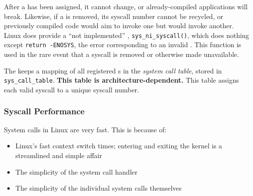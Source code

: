 After a  has been assigned, it cannot change, or already-compiled applications will break.
Likewise, if a  is removed, its syscall number cannot be recycled, or previously compiled code would aim to invoke one  but would invoke another.
Linux does provide a ``not implemented'' , \texttt{sys_ni_syscall()}, which does nothing except \texttt{return -ENOSYS}, the error corresponding to an invalid .
This function is used in the rare event that a syscall is removed or otherwise made unavailable.

The  keeps a mapping of all registered s in the \emph{system call table}, stored in \texttt{sys_call_table}.
\textbf{This table is architecture-dependent.}
This table assigns each valid syscall to a unique syscall number.

\subsubsection{Syscall Performance}\label{subsubsec:Syscall_Performance}
System calls in Linux are very fast.
This is because of:
\begin{itemize}[noitemsep]
\item Linux’s fast context switch times; entering and exiting the kernel is a streamlined and simple affair
\item The simplicity of the system call handler
\item The simplicity of the individual system calls themselves
\end{itemize}

